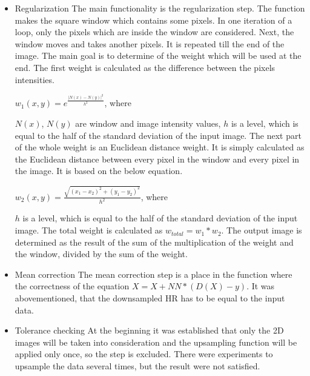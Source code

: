 \begin{enumerate}
\begin{itemize}
\item Regularization
\newline The main functionality is the regularization step. The function makes the square window which contains some pixels. In one iteration of a loop, only the pixels which are inside the window are considered. Next, the window moves and takes another pixels. It is repeated till the end of the image. The main goal is to determine of the weight which will be used at the end.
\newline The first weight is calculated as the difference between the pixels intensities.
\newline 
\centerline {$w_{1}(x, y)= e^{\frac{|N(x)-N(y)|^{2}}{h^{2}}}$, where}
\newline
\newline $N(x)$, $N(y)$ are window and image intensity values,
\newline $h$ is a level, which is equal to the half of the standard deviation of the input image.
\newline The next part of the whole weight is an Euclidean distance weight. It is simply calculated as the Euclidean distance between every pixel in the window and every pixel in the image. It is based on the below equation.
\newline
\centerline{ $w_{2}(x,y)=\frac{\sqrt{(x_{1}-x_{2})^{2}+(y_{1}-y_{2})^{2}}}{h^{2}}$, where }
\newline
\newline $h$ is a level, which is equal to the half of the standard deviation of the input image.
\newline The total weight is calculated as $w_{total}=w_{1}*w_{2}$. The output image is determined as the result of the sum of the multiplication of the weight and the window, divided by the sum of the weight.

\item Mean correction
\newline The mean correction step is a place in the function where the correctness of the equation $X=X+NN*(D(X)-y)$. It was abovementioned, that the downsampled HR has to be equal to the input data.

\item Tolerance checking
At the beginning it was established that only the 2D images will be taken into consideration and the upsampling function will be applied only once, so the step is excluded. There were experiments to upsample the data several times, but the result were not satisfied.


\end{itemize}
\end{enumerate}
